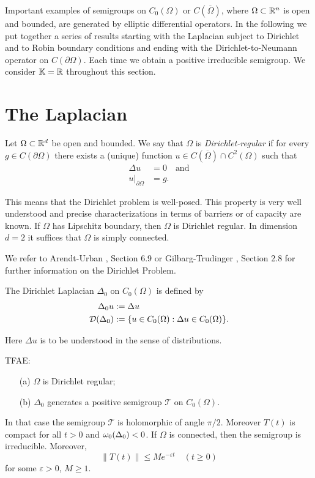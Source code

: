 Important examples of semigroups on $C_0(\Omega)$ or $C(\overline{\Omega})$, where $\Omega \subset \mathbb{R}^n$ is open and bounded, are generated by elliptic differential operators. In the following we put together a series of results starting with the Laplacian subject to Dirichlet and to Robin boundary conditions and ending with the Dirichlet-to-Neumann operator on $C(\partial\Omega)$. Each time we obtain a positive irreducible semigroup. We consider $\mathbb{K} = \mathbb{R}$ throughout this section.

\section{The Laplacian}

Let $\Omega \subset \mathbb{R}^d$ be open and bounded. We say that $\Omega$ is \emph{Dirichlet-regular} if for every $g \in C(\partial\Omega)$ there exists a (unique) function $u \in C(\overline{\Omega}) \cap C^2(\Omega)$ such that
\begin{align}
\Delta u &= 0 \quad \text{and} \\
u|_{\partial\Omega} &= g.
\end{align} 

This means that the Dirichlet problem is well-posed. This property is very well understood and precise characterizations in terms of barriers or of capacity are known. If $\Omega$ has Lipschitz boundary, then $\Omega$ is Dirichlet regular. In dimension $d = 2$ it suffices that $\Omega$ is simply connected.

We refer to Arendt-Urban \cite{Au23}, Section 6.9 or Gilbarg-Trudinger \cite{GT83}, Section 2.8 for further information on the Dirichlet Problem.

The Dirichlet Laplacian $\Delta_0$ on $C_0(\Omega)$ is defined by
\begin{align}
\Delta_0 u &:= \Delta u \\
\mathcal{D}(\Delta_0) &:= \{u \in C_0(\Omega) : \Delta u \in C_0(\Omega)\}.
\end{align}

Here $\Delta u$ is to be understood in the sense of distributions.

\begin{theorem}[4.1]
TFAE:
\begin{enumerate}
\item[(a)] $\Omega$ is Dirichlet regular;
\item[(b)] $\Delta_0$ generates a positive semigroup $\mathcal{T}$ on $C_0(\Omega)$.
\end{enumerate}
In that case the semigroup $\mathcal{T}$ is holomorphic of angle $\pi/2$. Moreover $T(t)$ is compact for all $t > 0$ and $\omega_0(\Delta_0) < 0$. If $\Omega$ is connected, then the semigroup is irreducible. Moreover,
\begin{equation}
\|T(t)\| \leq Me^{-\varepsilon t} \quad (t \geq 0)
\end{equation}
for some $\varepsilon > 0$, $M \geq 1$.
\end{theorem}

